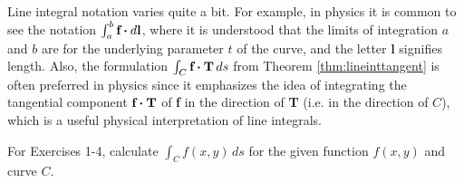 Line integral notation varies quite a bit. For example, in physics it is common to see the notation
$\int_a^b \textbf{f} \bm{\cdot} d\textbf{l}$, where it is understood that the limits of integration $a$ and $b$ are for
the underlying parameter $t$ of the curve, and the letter \textbf{l} signifies length. Also, the formulation
$\int_C \textbf{f} \bm{\cdot} \textbf{T}\,ds$ from Theorem \ref{thm:lineinttangent} is often preferred in physics since
it emphasizes the idea of integrating the tangential component $\textbf{f} \bm{\cdot} \textbf{T}$ of \textbf{f} in the
direction of \textbf{T} (i.e. in the direction of $C$), which is a useful physical interpretation of line integrals.
\newpage
\centerline{}\label{sec4dot1}
\par\noindent For Exercises 1-4, calculate $\int_C f(x,y)\,ds$ for the given function $f(x,y)$ and
curve $C$.
